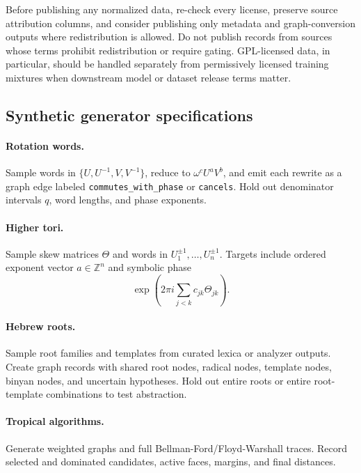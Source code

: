 \documentclass[11pt]{article}
\theoremstyle{definition}
\theoremstyle{plain}
\theoremstyle{remark}
\numberwithin{equation}{section}
\newcommand{\Z}{\mathbb{Z}}
\begin{document}
Before publishing any normalized data, re-check every license, preserve source attribution columns, and consider publishing only metadata and graph-conversion outputs where redistribution is allowed.  Do not publish records from sources whose terms prohibit redistribution or require gating.  GPL-licensed data, in particular, should be handled separately from permissively licensed training mixtures when downstream model or dataset release terms matter.

\subsection{Synthetic generator specifications}

\paragraph{Rotation words.}
Sample words in $\{U,U^{-1},V,V^{-1}\}$, reduce to $\omega^cU^aV^b$, and emit each rewrite as a graph edge labeled \texttt{commutes\_with\_phase} or \texttt{cancels}.  Hold out denominator intervals $q$, word lengths, and phase exponents.

\paragraph{Higher tori.}
Sample skew matrices $\Theta$ and words in $U_1^{\pm1},\ldots,U_n^{\pm1}$.  Targets include ordered exponent vector $a\in\Z^n$ and symbolic phase
\begin{equation}
  \exp\left(2\pi i\sum_{j<k}c_{jk}\Theta_{jk}\right).
\end{equation}

\paragraph{Hebrew roots.}
Sample root families and templates from curated lexica or analyzer outputs.  Create graph records with shared root nodes, radical nodes, template nodes, binyan nodes, and uncertain hypotheses.  Hold out entire roots or entire root-template combinations to test abstraction.

\paragraph{Tropical algorithms.}
Generate weighted graphs and full Bellman-Ford/Floyd-Warshall traces.  Record selected and dominated candidates, active faces, margins, and final distances.
\end{document}
